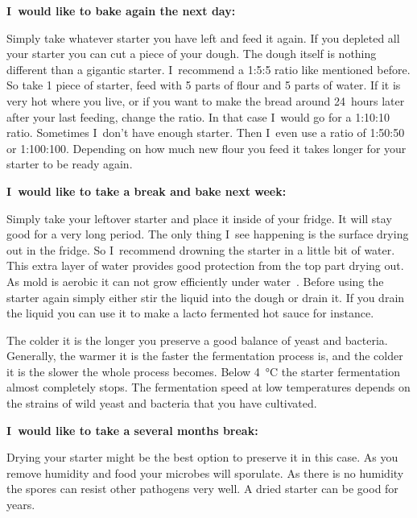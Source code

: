 \textbf{I~would like to bake again the next day:}

Simply take whatever starter you have left and feed it again. If you depleted
all your starter you can cut a piece of your dough. The dough itself is
nothing different than a gigantic starter. I~recommend a 1:5:5 ratio like
mentioned before. So take 1 piece of starter, feed with 5 parts of flour and 5
parts of water. If it is very hot where you live, or if you want to make the
bread around 24~hours later after your last feeding, change the ratio. In that
case I~would go for a 1:10:10 ratio. Sometimes I~don't have enough starter.
Then I~even use a ratio of 1:50:50 or 1:100:100. Depending on how much new
flour you feed it takes longer for your starter to be ready again.

\textbf{I~would like to take a break and bake next week:}

Simply take your leftover starter and place it inside of your fridge. It will stay good
for a very long period. The only thing I~see happening is the surface
drying out in the fridge. So I~recommend drowning the starter in a little bit
of water. This extra layer of water provides good protection from the top
part drying out. As mold is aerobic it can not grow efficiently under
water~\cite{mold+anaerobic}. Before using the starter again simply either stir
the liquid into the dough or drain it. If you drain the liquid you can use it
to make a lacto fermented hot sauce for instance.

The colder it is the longer you preserve a good balance of yeast and
bacteria. Generally, the warmer it is the faster the fermentation process is,
and the colder it is the slower the whole process becomes.
Below  \qty{4}{\degreeCelsius} the starter fermentation almost completely stops. The
fermentation speed at low temperatures depends on the
strains of wild yeast and bacteria
that you have cultivated.

\textbf{I~would like to take a several months break:}

Drying your starter might be the best option to preserve it in this case. As
you remove humidity and food your microbes will sporulate. As there is no
humidity the spores can resist other pathogens very well. A dried starter can
be good for years.

